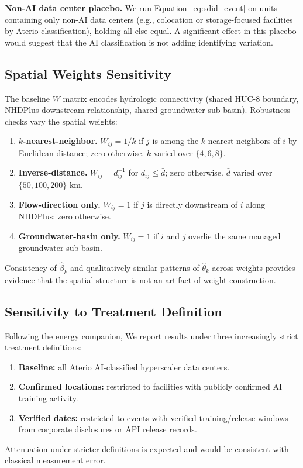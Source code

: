 \documentclass[11pt, letterpaper]{article}
\begin{document}
\textbf{Non-AI data center placebo.} We run Equation~\eqref{eq:sdid_event} on units containing only non-AI data centers (e.g., colocation or storage-focused facilities by Aterio classification), holding all else equal. A significant effect in this placebo would suggest that the AI classification is not adding identifying variation.

\subsection{Spatial Weights Sensitivity}
\label{sec:weights}

The baseline $W$ matrix encodes hydrologic connectivity (shared HUC-8 boundary, NHDPlus downstream relationship, shared groundwater sub-basin). Robustness checks vary the spatial weights:
\begin{enumerate}[label=(\roman*)]
\item \textbf{$k$-nearest-neighbor.} $W_{ij} = 1/k$ if $j$ is among the $k$ nearest neighbors of $i$ by Euclidean distance; zero otherwise. $k$ varied over $\{4, 6, 8\}$.
\item \textbf{Inverse-distance.} $W_{ij} = d_{ij}^{-1}$ for $d_{ij} \leq \bar{d}$; zero otherwise. $\bar{d}$ varied over $\{50, 100, 200\}$ km.
\item \textbf{Flow-direction only.} $W_{ij} = 1$ if $j$ is directly downstream of $i$ along NHDPlus; zero otherwise.
\item \textbf{Groundwater-basin only.} $W_{ij} = 1$ if $i$ and $j$ overlie the same managed groundwater sub-basin.
\end{enumerate}
Consistency of $\widehat{\beta}_k$ and qualitatively similar patterns of $\widehat{\theta}_k$ across weights provides evidence that the spatial structure is not an artifact of weight construction.

\subsection{Sensitivity to Treatment Definition}
\label{sec:treatmentdef}

Following the energy companion, We report results under three increasingly strict treatment definitions:
\begin{enumerate}[label=(\roman*)]
\item \textbf{Baseline:} all Aterio AI-classified hyperscaler data centers.
\item \textbf{Confirmed locations:} restricted to facilities with publicly confirmed AI training activity.
\item \textbf{Verified dates:} restricted to events with verified training/release windows from corporate disclosures or API release records.
\end{enumerate}
Attenuation under stricter definitions is expected and would be consistent with classical measurement error.
\end{document}

